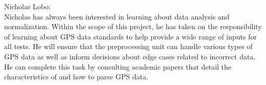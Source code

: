 \documentclass[12pt, titlepage]{article}
\begin{document}
\noindent Nicholas Lobo: \\
Nicholas has always been interested in learning about data analysis and normalization. Within the scope of this project, he has taken on the responsibility of learning about GPS data standards to help provide a wide range of inputs for all tests. He will ensure that the preprocessing unit can handle various types of GPS data as well as inform decisions about edge cases related to incorrect data. He can complete this task by consulting academic papers that detail the characteristics of and how to parse GPS data.\\
\end{document}
